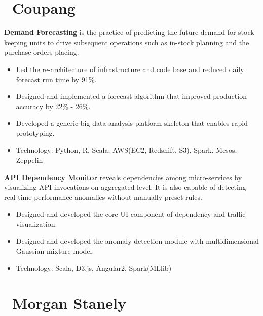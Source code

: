 \documentclass{resume}
\begin{document}





\section{\faUsers\ Coupang}
\textbf{Demand Forecasting} is the practice of predicting the future demand for stock keeping units to drive subsequent operations such as in-stock planning and the purchase orders placing.
\begin{itemize}
  \item Led the re-architecture of infrastructure and code base and reduced daily forecast run time by 91\%.
  \item Designed and implemented a forecast algorithm that improved production accuracy by 22\% - 26\%.
  \item Developed a generic big data analysis platform skeleton that enables rapid prototyping.
  \item Technology: Python, R, Scala, AWS(EC2, Redshift, S3), Spark, Mesos, Zeppelin
\end{itemize}

\textbf{API Dependency Monitor} reveals dependencies among micro-services by visualizing API invocations on aggregated level. It is also capable of detecting real-time performance anomalies without manually preset rules.
\begin{itemize}
  \item Designed and developed the core UI component of dependency and traffic visualization.
  \item Designed and developed the anomaly detection module with multidimensional Gaussian mixture model.
  \item Technology: Scala, D3.js, Angular2, Spark(MLlib)
\end{itemize}


\section{\faUsers\ Morgan Stanely}
\smallskip
\end{document}
